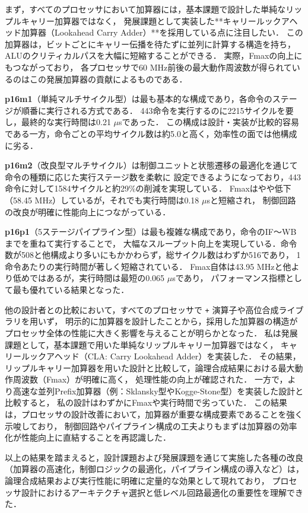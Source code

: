 \documentclass[autodetect-engine,dvi=dvipdfmx,ja=standard,
               a4j,11pt]{bxjsarticle}
\begin{document}
まず，すべてのプロセッサにおいて加算器には，基本課題で設計した単純なリップルキャリー加算器ではなく，
発展課題として実装した**キャリールックアヘッド加算器（Lookahead Carry Adder）**を採用している点に注目したい．
この加算器は，ビットごとにキャリー伝播を待たずに並列に計算する構造を持ち，ALUのクリティカルパスを大幅に短縮することができる．
実際，Fmaxの向上にもつながっており，
各プロセッサで60 MHz前後の最大動作周波数が得られているのはこの発展加算器の貢献によるものである．

\textbf{p16m1}（単純マルチサイクル型）は最も基本的な構成であり，各命令のステージが順番に実行される方式である．
443命令を実行するのに2215サイクルを要し，最終的な実行時間は0.21 $\mu$sであった．
この構成は設計・実装が比較的容易である一方，命令ごとの平均サイクル数は約5.0と高く，効率性の面では他構成に劣る．

\textbf{p16m2}（改良型マルチサイクル）は制御ユニットと状態遷移の最適化を通じて命令の種類に応じた実行ステージ数を柔軟に
設定できるようになっており，443命令に対して1584サイクルと約29\%の削減を実現している．
Fmaxはやや低下（58.45 MHz）しているが，それでも実行時間は0.18 $\mu$sと短縮され，
制御回路の改良が明確に性能向上につながっている．

\textbf{p16p1}（5ステージパイプライン型）は最も複雑な構成であり，命令のIF～WBまでを重ねて実行することで，
大幅なスループット向上を実現している．命令数が508と他構成より多いにもかかわらず，総サイクル数はわずか516であり，
1命令あたりの実行時間が著しく短縮されている．
Fmax自体は43.95 MHzと他より低めではあるが，実行時間は最短の0.065 $\mu$sであり，
パフォーマンス指標として最も優れている結果となった．

他の設計者との比較において，すべてのプロセッサで \texttt{+} 演算子や高位合成ライブラリを用いず，
明示的に加算器を設計したことから，採用した加算器の構造がプロセッサ全体の性能に大きく影響を与えることが明らかとなった．
私は発展課題として，基本課題で用いた単純なリップルキャリー加算器ではなく，
キャリールックアヘッド（CLA: Carry Lookahead Adder）を実装した．
その結果，リップルキャリー加算器を用いた設計と比較して，論理合成結果における最大動作周波数（Fmax）が明確に高く，
処理性能の向上が確認された．
一方で，より高速な並列Prefix加算器（例：Sklansky型やKogge-Stone型）を実装した設計と比較すると，
私の設計はわずかにFmaxや実行時間で劣っていた．
この結果は，プロセッサの設計改善において，加算器が重要な構成要素であることを強く示唆しており，
制御回路やパイプライン構成の工夫よりもまずは加算器の効率化が性能向上に直結することを再認識した．

以上の結果を踏まえると，設計課題および発展課題を通じて実施した各種の改良
（加算器の高速化，制御ロジックの最適化，パイプライン構成の導入など）は，
論理合成結果および実行性能に明確に定量的な効果として現れており，
プロセッサ設計におけるアーキテクチャ選択と低レベル回路最適化の重要性を理解できた．
\end{document}
